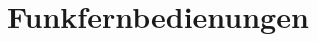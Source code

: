 \documentclass[12pt,a4paper]{article}
\begin{document}
\section{Funkfernbedienungen}

\end{document}
